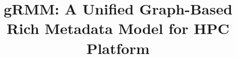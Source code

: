 \documentclass[10pt, conference]{IEEEtran}
\begin{document}
\title{gRMM: A Unified Graph-Based Rich Metadata Model for HPC Platform}


\maketitle










\end{document}
